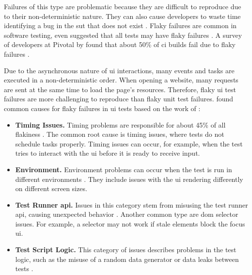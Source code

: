 Failures of this type are problematic because they are difficult to reproduce due to their non-deterministic nature.
They can also cause developers to waste time identifying a bug in the \ac{sut} that does not exist \autocite{ziftci_-flake_2020}.
Flaky failures are common in software testing, \citeauthor*{harman_start-ups_2018} even suggested that all tests may have flaky failures \autocite{harman_start-ups_2018}.
A survey of developers at Pivotal by \citeauthor*{hilton_trade-offs_2017} found that about 50\% of \ac{ci} builds fail due to flaky failures \autocite{hilton_trade-offs_2017}.

Due to the asynchronous nature of \ac{ui} interactions, many events and tasks are executed in a non-deterministic order.
When opening a website, many requests are sent at the same time to load the page's resources.
Therefore, flaky \ac{ui} test failures are more challenging to reproduce than flaky unit test failures.
 found common causes for flaky failures in \ac{ui} tests based on the work of \citeauthor*{luo_empirical_2014} \autocite{luo_empirical_2014,romano_empirical_2021}:

\begin{itemize}
	\item \textbf{Timing Issues.} Timing problems are responsible for about 45\% of all flakiness \autocite{romano_empirical_2021}.
	      The common root cause is timing issues, where tests do not schedule tasks properly.
	      Timing issues can occur, for example, when the test tries to interact with the \ac{ui} before it is ready to receive input.
	\item \textbf{Environment.} Environment problems can occur when the test is run in different environments \autocite{romano_empirical_2021}.
	      They include issues with the \ac{ui} rendering differently on different screen sizes.
	\item \textbf{Test Runner \acs{api}.} Issues in this category stem from misusing the test runner \ac{api}, causing unexpected behavior \autocite{romano_empirical_2021}.
	      Another common type are \ac{dom} selector issues.
	      For example, a selector may not work if stale elements block the focus \ac{ui}.
	\item \textbf{Test Script Logic.} This category of issues describes problems in the test logic, such as the misuse of a random data generator or data leaks between tests \autocite{romano_empirical_2021}.
\end{itemize}

